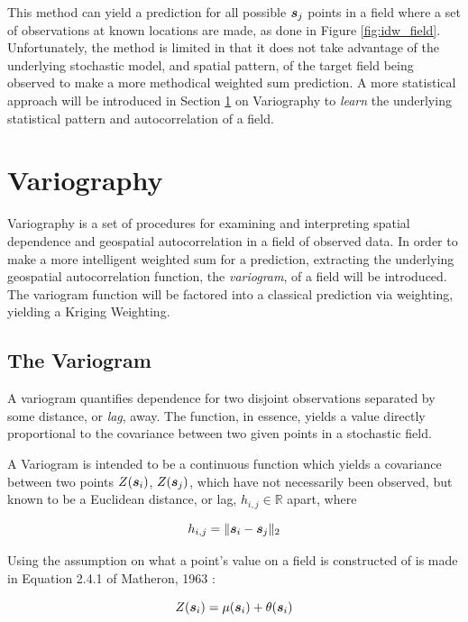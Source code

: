 This method can yield a prediction for all possible ${\it{\boldsymbol{s}}}_j$ points in a field where a set of observations at known locations are made, as done in Figure \ref{fig:idw_field}. Unfortunately, the method is limited in that it does not take advantage of the underlying stochastic model, and spatial pattern, of the target field being observed to make a more methodical weighted sum prediction. A more statistical approach will be introduced in Section \ref{sec:vario} on Variography to \textit{learn} the underlying statistical pattern and autocorrelation of a field.

\section{Variography} \label{sec:vario}
Variography is a set of procedures for examining and interpreting spatial dependence and geospatial autocorrelation in a field of observed data. In order to make a more intelligent weighted sum for a prediction, extracting the underlying geospatial autocorrelation function, the \textit{variogram}, of a field will be introduced. The variogram function will be factored into a classical prediction via weighting, yielding a Kriging Weighting.

\subsection{The Variogram}
A variogram quantifies dependence for two disjoint observations separated by some distance, or \textit{lag}, away. The function, in essence, yields a value directly proportional to the covariance between two given points in a stochastic field.

A Variogram is intended to be a continuous function which yields a covariance between two points $Z({\it{\boldsymbol{s}}}_{i})$, $Z({\it{\boldsymbol{s}}}_{j})$, which have not necessarily been observed, but known to be a Euclidean distance, or lag, $h_{i,j} \in \mathbb{R}$ apart, where

\begin{equation}
h_{i,j} = \| {\it{\boldsymbol{s}}}_i - {\it{\boldsymbol{s}}}_j \|_2
\label{eq:hdist}
\end{equation}

Using the assumption on what a point's value on a field is constructed of is made in Equation 2.4.1 of Matheron, 1963 \cite{matheron:geostat}:

\begin{equation}
    Z({\it{\boldsymbol{s}}}_i)=\mu({\it{\boldsymbol{s}}}_i)+\theta({\it{\boldsymbol{s}}}_i)
    \label{eq:matheron:assum}
\end{equation}

